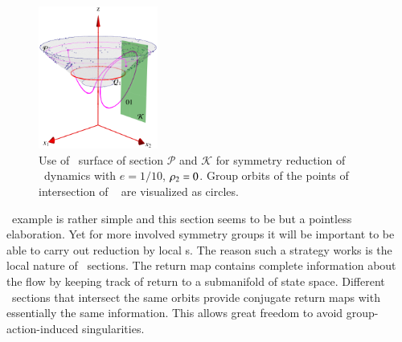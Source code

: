 \begin{figure}[ht]
\begin{center}
  \includegraphics[width=0.35\textwidth]{../figs/CLEmartini}
\end{center}
\caption{
Use of \Poincare\ surface of section $\mathcal{P}$ and
{\csection} $\mathcal{K}$ for symmetry reduction of \cLe\
dynamics with $e=1/10$, $\rho_2=0$. Group orbits of the
points of intersection of \rpo\  are visualized as
circles.
    }
\label{fig:CLEmartini}
\end{figure}

\CLe\ example is rather simple and this section seems to be but a pointless elaboration.
Yet for more involved symmetry groups it will be important to be able to
carry out reduction by local {\csection s}. The reason such a strategy works
is the local nature of \Poincare\ sections. The return map contains complete
information about the flow by keeping track of return to a submanifold of state space.
Different \Poincare\ sections that intersect the same orbits provide conjugate return
maps with essentially the same information. This allows great freedom to avoid group-action-induced
singularities.
